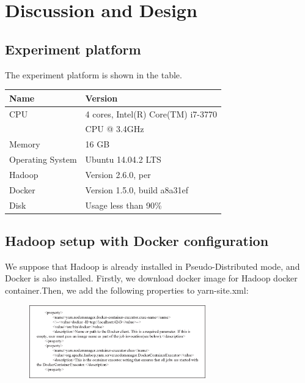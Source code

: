 \section{Discussion and Design}
\label{sec:design}

\subsection{Experiment platform}

The experiment platform is shown in the table.

\begin{table}[ht]

\begin{tabular}{|l|l|}
\hline 
Name & Version \\ 
\hline 
CPU & 4 cores, Intel(R) Core(TM) i7-3770 \\
& CPU @ 3.4GHz \\ 
\hline 
Memory & 16 GB \\ 
\hline 
Operating System & Ubuntu 14.04.2 LTS \\ 
\hline 
Hadoop & Version 2.6.0, per \\ 
\hline 
Docker & Version 1.5.0, build a8a31ef \\ 
\hline 
Disk & Usage less than 90\% \\ 
\hline 
\end{tabular}
\end{table}


\subsection{Hadoop setup with Docker configuration}

We suppose that Hadoop is already installed in Pseudo-Distributed mode, and Docker is also installed. Firstly, we download docker image for Hadoop docker container.Then, we add the following properties to yarn-site.xml:

\begin{figure}[h]
  \centering
  \includegraphics[width=3in]{figs/code.eps}
  \label{fig:codeoverview}
\end{figure}

